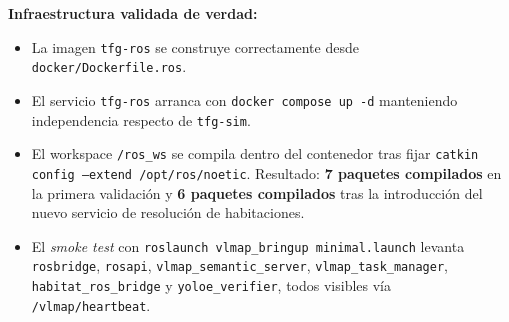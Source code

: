 \documentclass[11pt,a4paper]{article}
\begin{document}
\textbf{Infraestructura validada de verdad:}
\begin{itemize}
  \item La imagen \texttt{tfg-ros} se construye correctamente desde
        \texttt{docker/Dockerfile.ros}.
  \item El servicio \texttt{tfg-ros} arranca con \texttt{docker compose up -d}
        manteniendo independencia respecto de \texttt{tfg-sim}.
  \item El workspace \texttt{/ros\_ws} se compila dentro del contenedor tras
        fijar \texttt{catkin config --extend /opt/ros/noetic}. Resultado:
        \textbf{7 paquetes compilados} en la primera validación y
        \textbf{6 paquetes compilados} tras la introducción del nuevo servicio
        de resolución de habitaciones.
  \item El \emph{smoke test} con \texttt{roslaunch vlmap\_bringup minimal.launch}
        levanta \texttt{rosbridge}, \texttt{rosapi}, \texttt{vlmap\_semantic\_server},
        \texttt{vlmap\_task\_manager}, \texttt{habitat\_ros\_bridge} y
        \texttt{yoloe\_verifier}, todos visibles vía
        \texttt{/vlmap/heartbeat}.
\end{itemize}
\end{document}
